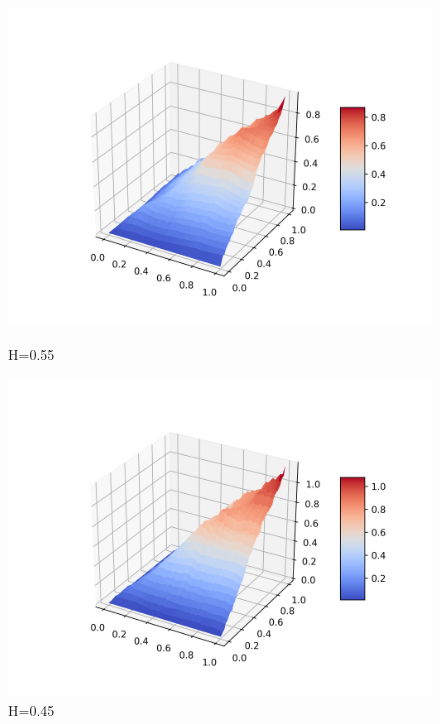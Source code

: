 \documentclass[a4paper,12pt]{article}
\numberwithin{equation}{section}
\begin{document}
	\begin{figure}[H]
		\includegraphics[scale=0.4]{covariance-1-55.png}
		\caption{H=0.55}
		\endminipage\hfill
		\includegraphics[scale=0.4]{covariance-1-45.png}
		\caption{H=0.45}
		\endminipage\hfill
	\end{figure}
	
\end{document}
